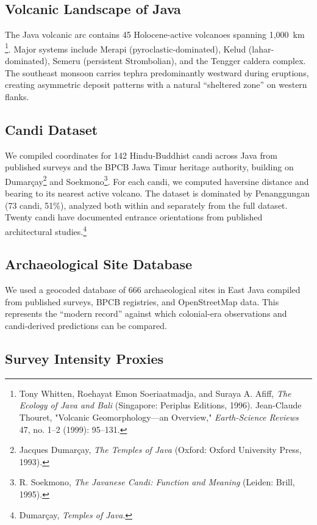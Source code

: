 \documentclass[12pt,a4paper]{article}
\begin{document}
\subsection{Volcanic Landscape of Java}

The Java volcanic arc contains 45 Holocene-active volcanoes spanning 1,000~km \footnote{Tony Whitten, Roehayat Emon Soeriaatmadja, and Suraya A. Afiff, \emph{The Ecology of Java and Bali} (Singapore: Periplus Editions, 1996). Jean-Claude Thouret, "Volcanic Geomorphology---an Overview," \emph{Earth-Science Reviews} 47, no. 1--2 (1999): 95--131.}. Major systems include Merapi (pyroclastic-dominated), Kelud (lahar-dominated), Semeru (persistent Strombolian), and the Tengger caldera complex. The southeast monsoon carries tephra predominantly westward during eruptions, creating asymmetric deposit patterns with a natural ``sheltered zone'' on western flanks.

\subsection{Candi Dataset}

We compiled coordinates for 142 Hindu-Buddhist candi across Java from published surveys and the BPCB Jawa Timur heritage authority, building on Dumar\c{c}ay\footnote{Jacques Dumar\c{c}ay, \emph{The Temples of Java} (Oxford: Oxford University Press, 1993).} and Soekmono\footnote{R. Soekmono, \emph{The Javanese Candi: Function and Meaning} (Leiden: Brill, 1995).}. For each candi, we computed haversine distance and bearing to its nearest active volcano. The dataset is dominated by Penanggungan (73 candi, 51\%), analyzed both within and separately from the full dataset. Twenty candi have documented entrance orientations from published architectural studies.\footnote{Dumar\c{c}ay, \emph{Temples of Java}.}

\subsection{Archaeological Site Database}

We used a geocoded database of 666 archaeological sites in East Java compiled from published surveys, BPCB registries, and OpenStreetMap data. This represents the ``modern record'' against which colonial-era observations and candi-derived predictions can be compared.

\subsection{Survey Intensity Proxies}
\end{document}
